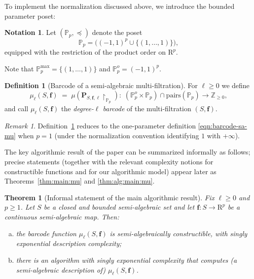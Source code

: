 \documentclass{amsart}[10pts]
\newtheorem*{theorem*}{Theorem}
\theoremstyle{definition}
\newtheorem{definition}{Definition}[section]
\newtheorem{notation}{Notation}[section]
\theoremstyle{remark}
\newtheorem{remark}{Remark}
\theoremstyle{observation}
\numberwithin{equation}{section}
\newcommand {\R} {\mathrm{R}}
\newcommand {\Z}  {\mathbb{Z}}
\newcommand {\PP}     {\mathbb{P}} %
\newcommand{\Pairs}{\mathrm{pairs}}
\begin{document}
\medskip
To implement the normalization discussed above, we introduce the bounded parameter poset:
\begin{notation}
\label{not:PP}
Let $(\PP_p,\preceq)$ denote the poset
\[
\PP_p=\bigl((-1,1)^p \cup \{(1,\ldots,1)\}\bigr),
\]
equipped with the restriction of the product order on $\R^p$.
\end{notation}
Note that $\PP_p^{\max}=\{(1,\ldots,1)\}$ and $\PP_p^{o}=(-1,1)^p$.

\begin{definition}[Barcode of a semi-algebraic multi-filtration]
\label{def:sa-mp-barcode-mu}
For $\ell\ge 0$ we define
\[
\mu_\ell(S,\mathbf f)
\;=\;
\mu\!\left(\mathbf P_{S,\mathbf f,\ell}\!\restriction_{\PP_p}\right)
:\; (\PP_p^{o}\times \PP_p)\cap \Pairs(\PP_p)\longrightarrow \Z_{\ge 0},
\]
and call $\mu_\ell(S,\mathbf f)$ the \emph{degree-$\ell$ barcode} of the multi-filtration $(S,\mathbf f)$.
\end{definition}

\begin{remark}
Definition~\ref{def:sa-mp-barcode-mu} reduces to the one-parameter definition \eqref{eqn:barcode-sa-mu} when $p=1$ (under the normalization convention identifying $1$ with $+\infty$).
\end{remark}



The key algorithmic result of the paper can be summarized informally as follows; precise statements (together with the relevant complexity notions for constructible functions and for our algorithmic model) appear later as Theorems~\ref{thm:main:mu} and \ref{thm:alg:main:mu}.

\begin{theorem*}[Informal statement of the main algorithmic result]
\label{thm:informal:main:mu}
Fix $\ell\ge 0$ and $p\ge 1$. Let $S$ be a closed and bounded semi-algebraic set and let $\mathbf f:S\to \R^p$ be a continuous semi-algebraic map. Then:
\begin{enumerate}[(a)]
\item the barcode function $\mu_\ell(S,\mathbf f)$ is semi-algebraically constructible, with singly exponential description complexity;
\item there is an algorithm with singly exponential complexity that computes (a semi-algebraic description of) $\mu_\ell(S,\mathbf f)$.
\end{enumerate}
\end{theorem*}
\end{document}
